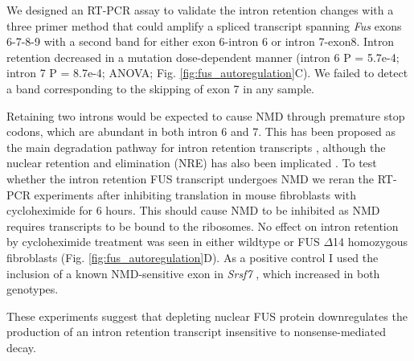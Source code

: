 We designed an RT-PCR assay to validate the intron retention changes with a three primer method that could amplify a spliced transcript spanning \textit{Fus} exons 6-7-8-9 with a second band for either exon 6-intron 6 or intron 7-exon8. 
Intron retention decreased in a mutation dose-dependent manner (intron 6 P = 5.7e-4; intron 7 P = 8.7e-4; ANOVA; Fig. \ref{fig:fus_autoregulation}C).
We failed to detect a band corresponding to the skipping of exon 7 in any sample. 

Retaining two introns would be expected to cause NMD through premature stop codons, which are abundant in both intron 6 and 7. 
This has been proposed as the main degradation pathway for intron retention transcripts \citep{Wong2013}, although the  nuclear retention and elimination (NRE) has also been implicated \citep{Yap2013}. 
To test whether the intron retention FUS transcript undergoes NMD we reran the RT-PCR experiments after inhibiting translation in mouse fibroblasts with cycloheximide for 6 hours.
This should cause NMD to be inhibited as NMD requires transcripts to be bound to the ribosomes.
No effect on intron retention by cycloheximide treatment was seen in either wildtype or FUS $\Delta$14 homozygous fibroblasts (Fig. \ref{fig:fus_autoregulation}D).
As a positive control I used the inclusion of a known NMD-sensitive exon in \textit{Srsf7} \citep{Edwards2016}, which increased in both genotypes. 

These experiments suggest that depleting nuclear FUS protein downregulates the production of an intron retention transcript insensitive to nonsense-mediated decay. 






